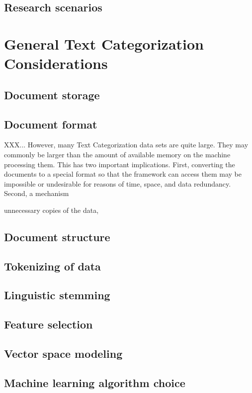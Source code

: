 \documentclass[a4paper]{report}
\begin{document}
\subsection{Research scenarios}

\section{General Text Categorization Considerations}
\subsection{Document storage}
\label{Document storage}

\subsection{Document format}
\label{Document format}

XXX... However, many Text Categorization data sets are quite large.  They may
commonly be larger than the amount of available memory on the machine
processing them.  This has two important implications.  First,
converting the documents to a special format so that the framework can
access them may be impossible or undesirable for reasons of time,
space, and data redundancy.  Second, a mechanism 

unnecessary copies of the data, 

\subsection{Document structure}
\subsection{Tokenizing of data}
\subsection{Linguistic stemming}
\subsection{Feature selection}
\subsection{Vector space modeling}
\subsection{Machine learning algorithm choice}
\end{document}
